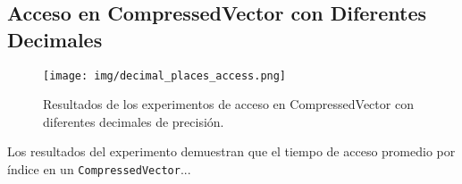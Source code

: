 \subsection{Acceso en CompressedVector con Diferentes Decimales}
\label{exp:cvd-access-decimals}

\begin{figure}[H]
    \centering
    \texttt{[image: img/decimal\_places\_access.png]}
    \caption{Resultados de los experimentos de acceso en CompressedVector con diferentes decimales de precisión.}
    \label{fig:cvd-access-decimals}
\end{figure}

Los resultados del experimento demuestran que el tiempo de acceso promedio por índice en un \texttt{CompressedVector}...


